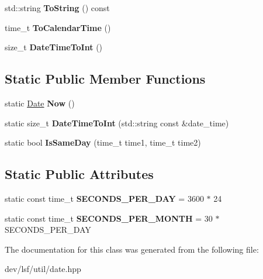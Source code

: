 \begin{DoxyCompactItemize}
\item 
\hypertarget{classlsf_1_1util_1_1Date_a1879074d4a88c2a6ae7d8d1363690e7d}{
std::string {\bfseries ToString} () const }
\label{classlsf_1_1util_1_1Date_a1879074d4a88c2a6ae7d8d1363690e7d}

\item 
\hypertarget{classlsf_1_1util_1_1Date_afc93673689169a1e38028276b86aaede}{
time\_\-t {\bfseries ToCalendarTime} ()}
\label{classlsf_1_1util_1_1Date_afc93673689169a1e38028276b86aaede}

\item 
\hypertarget{classlsf_1_1util_1_1Date_afb6f5e91e41f34f16cd17695d49209f2}{
size\_\-t {\bfseries DateTimeToInt} ()}
\label{classlsf_1_1util_1_1Date_afb6f5e91e41f34f16cd17695d49209f2}

\end{DoxyCompactItemize}
\subsection*{Static Public Member Functions}
\begin{DoxyCompactItemize}
\item 
\hypertarget{classlsf_1_1util_1_1Date_ae52f295294f1aecf8c400bd580b4efdf}{
static \hyperlink{classlsf_1_1util_1_1Date}{Date} {\bfseries Now} ()}
\label{classlsf_1_1util_1_1Date_ae52f295294f1aecf8c400bd580b4efdf}

\item 
\hypertarget{classlsf_1_1util_1_1Date_a62ce080a6e8932304c3274ce33a4236d}{
static size\_\-t {\bfseries DateTimeToInt} (std::string const \&date\_\-time)}
\label{classlsf_1_1util_1_1Date_a62ce080a6e8932304c3274ce33a4236d}

\item 
\hypertarget{classlsf_1_1util_1_1Date_a3c8f14109d7553358bc31d5fb9f6f789}{
static bool {\bfseries IsSameDay} (time\_\-t time1, time\_\-t time2)}
\label{classlsf_1_1util_1_1Date_a3c8f14109d7553358bc31d5fb9f6f789}

\end{DoxyCompactItemize}
\subsection*{Static Public Attributes}
\begin{DoxyCompactItemize}
\item 
\hypertarget{classlsf_1_1util_1_1Date_ab42e4a4275f5fd0c91531c896a3f7851}{
static const time\_\-t {\bfseries SECONDS\_\-PER\_\-DAY} = 3600 $\ast$ 24}
\label{classlsf_1_1util_1_1Date_ab42e4a4275f5fd0c91531c896a3f7851}

\item 
\hypertarget{classlsf_1_1util_1_1Date_ae821aa5edb07ee100955e60280dcc07f}{
static const time\_\-t {\bfseries SECONDS\_\-PER\_\-MONTH} = 30 $\ast$ SECONDS\_\-PER\_\-DAY}
\label{classlsf_1_1util_1_1Date_ae821aa5edb07ee100955e60280dcc07f}

\end{DoxyCompactItemize}


The documentation for this class was generated from the following file:\begin{DoxyCompactItemize}
\item 
dev/lsf/util/date.hpp\end{DoxyCompactItemize}
